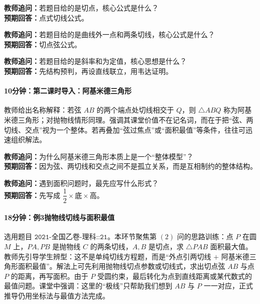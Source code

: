 \documentclass[UTF8,a4paper,11pt]{ctexart}
\begin{document}
\noindent\textbf{教师追问：}若题目给的是切点，核心公式是什么？\\

\textbf{预期回答：}点式切线公式。\par

\noindent\textbf{教师追问：}若题目给的是曲线外一点和两条切线，核心公式是什么？\\

\textbf{预期回答：}切点弦公式。\par

\noindent\textbf{教师追问：}若题目给的是斜率和为定值，核心思想是什么？\\

\textbf{预期回答：}先结构预判，再设直线联立，用韦达证明。\par

\paragraph{10分钟：第二课时导入：阿基米德三角形}

教师给出名称解释：若弦 $AB$ 的两个端点处切线相交于 $Q$，则 $\triangle ABQ$ 称为阿基米德三角形；对抛物线情形同理。强调其课堂价值不在记名词，而在于把“弦、两切线、交点”视为一个整体。若再叠加“弦过焦点”或“面积最值”等条件，往往可迅速组织解法。

\noindent\textbf{教师追问：}为什么阿基米德三角形本质上是一个“整体模型”？\\

\textbf{预期回答：}因为弦、两切线和交点之间不是孤立关系，而是互相制约的整体结构。\par

\noindent\textbf{教师追问：}遇到面积问题时，最先应写什么形式？\\

\textbf{预期回答：}先写成 $\dfrac12\times \text{底} \times \text{高}$。\par

\paragraph{18分钟：例3抛物线切线与面积最值}

选用题目 $\texttt{2021-全国乙卷-理科::21}$。本环节聚焦第 $(2)$ 问的思路训练：点 $P$ 在圆 $M$ 上，$PA,PB$ 是抛物线 $C$ 的两条切线，$A,B$ 是切点，求 $\triangle PAB$ 面积最大值。教师先引导学生辨型：这不是单纯切线方程题，而是“外点引两切线 $+$ 阿基米德三角形面积最值”。解法上可先利用抛物线切点参数或切线式，求出切点弦 $AB$ 与点 $P$ 的距离，再写面积。由于 $P$ 受圆约束，最后转化为点到直线距离或某代数式的最值问题。课堂中强调：这里的“极线”只帮助我们想到 $AB$ 与 $P$ 一一对应，正式推导仍用坐标法与最值方法完成。
\end{document}
